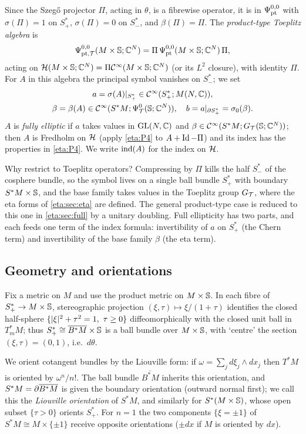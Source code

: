 Since the Szeg\H{o} projector $\Pi$, acting in $\theta$, is a fibrewise operator, it is in
$\Psi^{0,0}_{\mathrm{pt}}$ with $\sigma(\Pi)=1$ on $S^*_+$, $\sigma(\Pi)=0$ on $S^*_-$, and
$\beta(\Pi)=\Pi$. The \emph{product-type Toeplitz algebra} is
\[
\Psi^{0,0}_{\mathrm{pt},\mathcal{T}}(M\times\mathbb{S};\mathbb{C}^N)=\Pi\,\Psi^{0,0}_{\mathrm{pt}}(M\times\mathbb{S};\mathbb{C}^N)\,\Pi,
\]
acting on $\mathcal{H}(M\times\mathbb{S};\mathbb{C}^N)=\Pi\mathcal{C}^\infty(M\times\mathbb{S};\mathbb{C}^N)$ (or its $L^2$
closure), with identity $\Pi$. For $A$ in this algebra the principal symbol vanishes
on $S^*_-$; we set
\begin{gather*}
a=\sigma(A)|_{S^*_+}\in\mathcal{C}^\infty(S^*_+;M(N,\mathbb{C})),\\
\beta=\beta(A)\in\mathcal{C}^\infty(S^*M;\Psi^{0}_{\mathcal{T}}(\mathbb{S};\mathbb{C}^N)),\quad b=a|_{\partial S^*_+}=\sigma_0(\beta).
\end{gather*}
$A$ is \emph{fully elliptic} if $a$ takes values in $\operatorname{GL}(N,\mathbb{C})$ and
$\beta\in\mathcal{C}^\infty(S^*M;G_{\mathcal{T}}(\mathbb{S};\mathbb{C}^N))$; then $A$ is Fredholm on $\mathcal{H}$ (apply
\ref{eta:P4} to $A+\operatorname{Id}-\Pi$) and its index has the properties in \ref{eta:P4}. We
write $\operatorname{ind}(A)$ for the index on $\mathcal{H}$.

\begin{discussion}
  Why restrict to Toeplitz operators? Compressing by $\Pi$ kills the half
  $S^*_-$ of the cosphere bundle, so the symbol lives on a single ball bundle
  $S^*_+$ with boundary $S^*M\times\mathbb{S}$, and the base family takes values in
  the Toeplitz group $G_{\mathcal{T}}$, where the eta forms of \cref{eta:sec:eta} are
  defined. The general product-type case is reduced to this one in
  \cref{eta:sec:full} by a unitary doubling. Full ellipticity has two parts, and
  each feeds one term of the index formula: invertibility of $a$ on $S^*_+$
  (the Chern term) and invertibility of the base family $\beta$ (the eta term).
\end{discussion}

\subsection{Geometry and orientations} Fix a metric on $M$ and use the product metric
on $M\times\mathbb{S}$. In each fibre of $S^*_+\to M\times\mathbb{S}$, stereographic
projection $(\xi,\tau)\mapsto\xi/(1+\tau)$ identifies the closed half-sphere
$\{\lvert \xi\rvert^2+\tau^2=1,\ \tau\ge0\}$ diffeomorphically with the closed unit ball in
$T^*_mM$; thus $S^*_+\cong\overline{B^*M}\times\mathbb{S}$ is a ball bundle over
$M\times\mathbb{S}$, with `centre' the section $(\xi,\tau)=(0,1)$, i.e.\ $d\theta$.

We orient cotangent bundles by the Liouville form: if $\omega=\sum_jd\xi_j\wedge dx_j$
then $T^*M$ is oriented by $\omega^n/n!$. The ball bundle $\overline{B^*M}$ inherits
this orientation, and $S^*M=\partial\overline{B^*M}$ is given the boundary orientation
(outward normal first); we call this the \emph{Liouville orientation} of $S^*M$, and
similarly for $S^*(M\times\mathbb{S})$, whose open subset $\{\tau>0\}$ orients $S^*_+$.
For $n=1$ the two components $\{\xi=\pm1\}$ of $S^*M\cong M\times\{\pm1\}$ receive
opposite orientations ($\pm dx$ if $M$ is oriented by $dx$).

